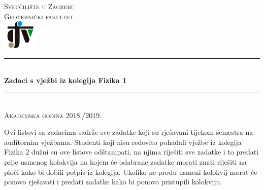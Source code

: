 \documentclass[12pt]{report}
\begin{document}
\begin{titlepage}

\newcommand{\HRule}{\rule{\linewidth}{0.5mm}} %

\center %

\textsc{\Large Sveučilište u Zagrebu\\ Geotehnički fakultet}\\[1.0cm] %

\includegraphics{logo_gfv.png}\\[2.0cm] %


\HRule \\[0.4cm]
{ \huge \bfseries Zadaci s vježbi iz kolegija Fizika 1}\\[0.4cm] %
\HRule \\[1.5cm]

\textsc{\large Akademska godina 2018./2019.}\\[0.5cm] %

\justify
 
\begin{center}
\begin{minipage}{0.8\textwidth}
\begin{justify} 
Ovi listovi sa zadacima sadrže sve zadatke koji su rješavani
tijekom semestra na auditornim vježbama. Studenti koji nisu
redovito pohađali vježbe iz kolegija Fizika 2 dužni su ove listove
odštampati, na njima riješiti sve zadatke i to predati prije
usmenog kolokvija na kojem će odabrane zadatke morati znati
riješiti na ploči kako bi dobili potpis iz kolegija. Ukoliko ne prođu
usmeni kolokvij morat će ponovo rješavati i predati zadatke kako
bi ponovo pristupili kolokviju.
\end{justify}
\end{minipage}\\[3cm]
\end{center}


\end{titlepage}
\end{document}

